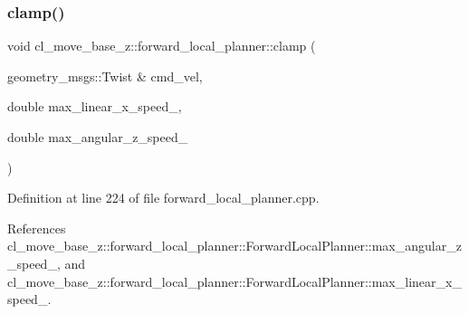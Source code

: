 \subsubsection{\texorpdfstring{clamp()}{clamp()}}
{\footnotesize\ttfamily void cl\+\_\+move\+\_\+base\+\_\+z\+::forward\+\_\+local\+\_\+planner\+::clamp (\begin{DoxyParamCaption}\item[{geometry\+\_\+msgs\+::\+Twist \&}]{cmd\+\_\+vel,  }\item[{double}]{max\+\_\+linear\+\_\+x\+\_\+speed\+\_\+,  }\item[{double}]{max\+\_\+angular\+\_\+z\+\_\+speed\+\_\+ }\end{DoxyParamCaption})}



Definition at line 224 of file forward\+\_\+local\+\_\+planner.\+cpp.



References cl\+\_\+move\+\_\+base\+\_\+z\+::forward\+\_\+local\+\_\+planner\+::\+Forward\+Local\+Planner\+::max\+\_\+angular\+\_\+z\+\_\+speed\+\_\+, and cl\+\_\+move\+\_\+base\+\_\+z\+::forward\+\_\+local\+\_\+planner\+::\+Forward\+Local\+Planner\+::max\+\_\+linear\+\_\+x\+\_\+speed\+\_\+.


